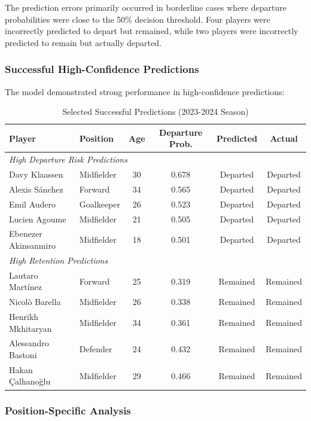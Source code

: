 The prediction errors primarily occurred in borderline cases where departure probabilities were close to the 50\% decision threshold. Four players were incorrectly predicted to depart but remained, while two players were incorrectly predicted to remain but actually departed.

\subsubsection{Successful High-Confidence Predictions}

The model demonstrated strong performance in high-confidence predictions:

\begin{table}[H]
\centering
\caption{Selected Successful Predictions (2023-2024 Season)}
\label{tab:successful_predictions_2023_2024}
\begin{tabular}{llcccc}
\toprule
\textbf{Player} & \textbf{Position} & \textbf{Age} & \textbf{Departure Prob.} & \textbf{Predicted} & \textbf{Actual} \\
\midrule
\multicolumn{6}{l}{\textit{High Departure Risk Predictions}} \\
Davy Klaassen & Midfielder & 30 & 0.678 & Departed & Departed \\
Alexis Sánchez & Forward & 34 & 0.565 & Departed & Departed \\
Emil Audero & Goalkeeper & 26 & 0.523 & Departed & Departed \\
Lucien Agoume & Midfielder & 21 & 0.505 & Departed & Departed \\
Ebenezer Akinsanmiro & Midfielder & 18 & 0.501 & Departed & Departed \\
\midrule
\multicolumn{6}{l}{\textit{High Retention Predictions}} \\
Lautaro Martínez & Forward & 25 & 0.319 & Remained & Remained \\
Nicolò Barella & Midfielder & 26 & 0.338 & Remained & Remained \\
Henrikh Mkhitaryan & Midfielder & 34 & 0.361 & Remained & Remained \\
Alessandro Bastoni & Defender & 24 & 0.432 & Remained & Remained \\
Hakan Çalhanoğlu & Midfielder & 29 & 0.466 & Remained & Remained \\
\bottomrule
\end{tabular}
\end{table}

\subsubsection{Position-Specific Analysis}

